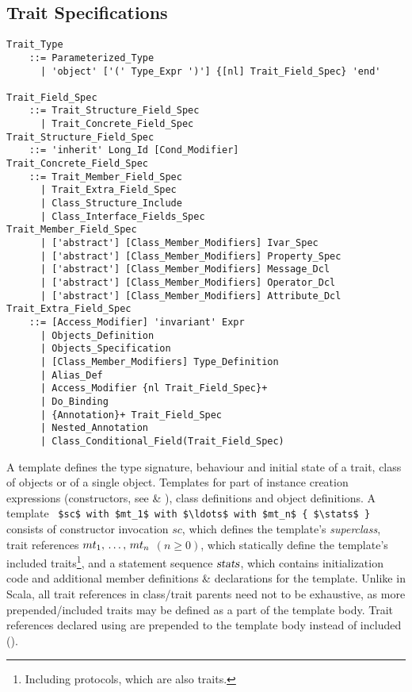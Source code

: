 \subsection{Trait Specifications}
\label{sec:trait-specs}

\grammar\begin{lstlisting}
Trait_Type
    ::= Parameterized_Type
      | 'object' ['(' Type_Expr ')'] {[nl] Trait_Field_Spec} 'end'

Trait_Field_Spec
    ::= Trait_Structure_Field_Spec
      | Trait_Concrete_Field_Spec
Trait_Structure_Field_Spec
    ::= 'inherit' Long_Id [Cond_Modifier]
Trait_Concrete_Field_Spec
    ::= Trait_Member_Field_Spec
      | Trait_Extra_Field_Spec
      | Class_Structure_Include
      | Class_Interface_Fields_Spec
Trait_Member_Field_Spec
      | ['abstract'] [Class_Member_Modifiers] Ivar_Spec
      | ['abstract'] [Class_Member_Modifiers] Property_Spec
      | ['abstract'] [Class_Member_Modifiers] Message_Dcl
      | ['abstract'] [Class_Member_Modifiers] Operator_Dcl
      | ['abstract'] [Class_Member_Modifiers] Attribute_Dcl
Trait_Extra_Field_Spec
    ::= [Access_Modifier] 'invariant' Expr
      | Objects_Definition
      | Objects_Specification
      | [Class_Member_Modifiers] Type_Definition
      | Alias_Def
      | Access_Modifier {nl Trait_Field_Spec}+
      | Do_Binding
      | {Annotation}+ Trait_Field_Spec
      | Nested_Annotation
      | Class_Conditional_Field(Trait_Field_Spec)
\end{lstlisting}






A template defines the type signature, behaviour and initial state of a trait, class of objects or of a single object. Templates for part of instance creation expressions (constructors, see  \& ), class definitions and object definitions. A template ~\lstinline!$sc$ with $mt_1$ with $\ldots$ with $mt_n$ { $\stats$ }!~ consists of constructor invocation $sc$, which defines the template's {\em superclass}, trait references $mt_1 ,\, \ldots ,\, mt_n$ $(n \geq 0)$, which statically define the template's included traits\footnote{Including protocols, which are also traits.}, and a statement sequence $\mbox{\sl stats}$, which contains initialization code and additional member definitions \& declarations for the template. Unlike in Scala, all trait references in class/trait parents need not to be exhaustive, as more prepended/included traits may be defined as a part of the template body. Trait references declared using  are prepended to the template body instead of included (). 

